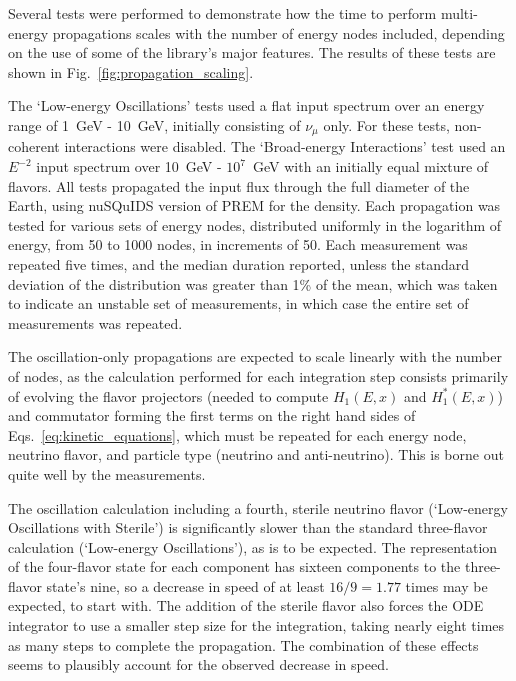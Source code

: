 \documentclass[3p,12pt]{elsarticle}
\newcommand{\ttf}{\ttfamily}
\begin{document}
Several tests were performed to demonstrate how the time to perform multi-energy propagations scales with the number of energy nodes included, depending on the use of some of the library's major features. 
The results of these tests are shown in Fig.~\ref{fig:propagation_scaling}. 

The `Low-energy Oscillations' tests used a flat input spectrum  over an energy range of 1~GeV - 10~GeV, initially consisting of $\nu_\mu$ only. 
For these tests, non-coherent interactions were disabled. 
The `Broad-energy Interactions' test used an $E^{-2}$ input spectrum over 10~GeV - $10^7$~GeV with an initially equal mixture of flavors. 
All tests propagated the input flux through the full diameter of the Earth, using {\ttf nuSQuIDS} version of PREM for the density. 
Each propagation was tested for various sets of energy nodes, distributed uniformly in the logarithm of energy, from 50 to 1000 nodes, in increments of 50. 
Each measurement was repeated five times, and the median duration reported, unless the standard deviation of the distribution was greater than 1\% of the mean, which was taken to indicate an unstable set of measurements, in which case the entire set of measurements was repeated. 

The oscillation-only propagations are expected to scale linearly with the number of nodes, as the calculation performed for each integration step consists primarily of evolving the flavor projectors (needed to compute $H_1(E,x)$ and $H^*_1(E,x)$) and commutator forming the first terms on the right hand sides of Eqs.~\ref{eq:kinetic_equations}, which must be repeated for each energy node, neutrino flavor, and particle type (neutrino and anti-neutrino).
This is borne out quite well by the measurements. 

The oscillation calculation including a fourth, sterile neutrino flavor (`Low-energy Oscillations with Sterile') is significantly slower than the standard three-flavor calculation (`Low-energy Oscillations'), as is to be expected. 
The representation of the four-flavor state for each component has sixteen components to the three-flavor state's nine, so a decrease in speed of at least $16/9 = 1.77$ times may be expected, to start with. 
The addition of the sterile flavor also forces the ODE integrator to use a smaller step size for the integration, taking nearly eight times as many steps to complete the propagation. 
The combination of these effects seems to plausibly account for the observed decrease in speed. 
\end{document}
